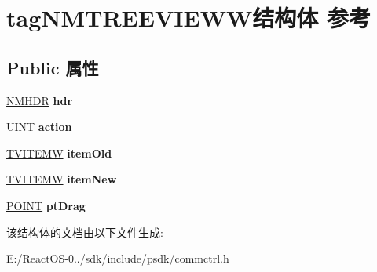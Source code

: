 \hypertarget{structtag_n_m_t_r_e_e_v_i_e_w_w}{}\section{tag\+N\+M\+T\+R\+E\+E\+V\+I\+E\+W\+W结构体 参考}
\label{structtag_n_m_t_r_e_e_v_i_e_w_w}
\subsection*{Public 属性}
\begin{DoxyCompactItemize}
\item 
\mbox{\label{structtag_n_m_t_r_e_e_v_i_e_w_w_a5e21d65df68280a5947fc323ab84ae23}} 
\hyperlink{structtag_n_m_h_d_r}{N\+M\+H\+DR} {\bfseries hdr}
\item 
\mbox{\label{structtag_n_m_t_r_e_e_v_i_e_w_w_a9e5d2329f797bdcc25c6f1dce1da95d9}} 
U\+I\+NT {\bfseries action}
\item 
\mbox{\label{structtag_n_m_t_r_e_e_v_i_e_w_w_ad2ef4def2a183a8731454ef2abf75a0f}} 
\hyperlink{structtag_t_v_i_t_e_m_w}{T\+V\+I\+T\+E\+MW} {\bfseries item\+Old}
\item 
\mbox{\label{structtag_n_m_t_r_e_e_v_i_e_w_w_a8d67143464d09377c84e550c7a68310b}} 
\hyperlink{structtag_t_v_i_t_e_m_w}{T\+V\+I\+T\+E\+MW} {\bfseries item\+New}
\item 
\mbox{\label{structtag_n_m_t_r_e_e_v_i_e_w_w_a5601bc36c263fb611e06f818d5c3e28d}} 
\hyperlink{structtag_p_o_i_n_t}{P\+O\+I\+NT} {\bfseries pt\+Drag}
\end{DoxyCompactItemize}


该结构体的文档由以下文件生成\+:\begin{DoxyCompactItemize}
\item 
E\+:/\+React\+O\+S-\/0../sdk/include/psdk/commctrl.\+h\end{DoxyCompactItemize}
